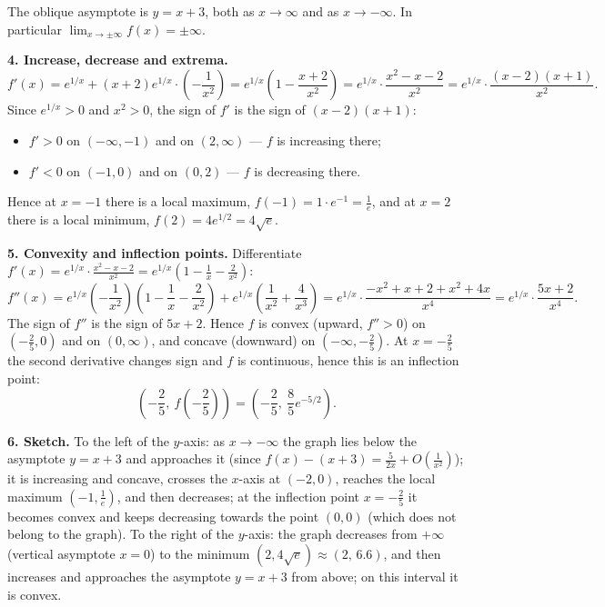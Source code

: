 \begin{solution}
\begin{itemize}
  The oblique asymptote is $y=x+3$, both as $x\to\infty$ and as $x\to-\infty$. In particular $\lim_{x\to\pm\infty}f(x)=\pm\infty$.
\end{itemize}

\textbf{4. Increase, decrease and extrema.}
\[ f'(x)=e^{1/x}+(x+2)e^{1/x}\cdot\left(-\frac{1}{x^2}\right)=e^{1/x}\left(1-\frac{x+2}{x^2}\right)=e^{1/x}\cdot\frac{x^2-x-2}{x^2}=e^{1/x}\cdot\frac{(x-2)(x+1)}{x^2}. \]
Since $e^{1/x}>0$ and $x^2>0$, the sign of $f'$ is the sign of $(x-2)(x+1)$:
\begin{itemize}
  \item $f'>0$ on $(-\infty,-1)$ and on $(2,\infty)$ — $f$ is increasing there;
  \item $f'<0$ on $(-1,0)$ and on $(0,2)$ — $f$ is decreasing there.
\end{itemize}
Hence at $x=-1$ there is a local maximum, $f(-1)=1\cdot e^{-1}=\frac1e$, and at $x=2$ there is a local minimum, $f(2)=4e^{1/2}=4\sqrt e$.

\textbf{5. Convexity and inflection points.} Differentiate $f'(x)=e^{1/x}\cdot\frac{x^2-x-2}{x^2}=e^{1/x}\left(1-\frac1x-\frac2{x^2}\right)$:
\[ f''(x)=e^{1/x}\left(-\frac1{x^2}\right)\left(1-\frac1x-\frac2{x^2}\right)+e^{1/x}\left(\frac1{x^2}+\frac4{x^3}\right)
=e^{1/x}\cdot\frac{-x^2+x+2+x^2+4x}{x^4}=e^{1/x}\cdot\frac{5x+2}{x^4}. \]
The sign of $f''$ is the sign of $5x+2$. Hence $f$ is convex (upward, $f''>0$) on $\left(-\frac25,0\right)$ and on $(0,\infty)$, and concave (downward) on $\left(-\infty,-\frac25\right)$. At $x=-\frac25$ the second derivative changes sign and $f$ is continuous, hence this is an inflection point:
\[ \left(-\frac25,\ f\left(-\frac25\right)\right)=\left(-\frac25,\ \frac85e^{-5/2}\right). \]

\textbf{6. Sketch.} To the left of the $y$-axis: as $x\to-\infty$ the graph lies below the asymptote $y=x+3$ and approaches it (since $f(x)-(x+3)=\frac{5}{2x}+O\left(\frac1{x^2}\right)$); it is increasing and concave, crosses the $x$-axis at $(-2,0)$, reaches the local maximum $\left(-1,\frac1e\right)$, and then decreases; at the inflection point $x=-\frac25$ it becomes convex and keeps decreasing towards the point $(0,0)$ (which does not belong to the graph). To the right of the $y$-axis: the graph decreases from $+\infty$ (vertical asymptote $x=0$) to the minimum $(2,4\sqrt e)\approx(2,\,6.6)$, and then increases and approaches the asymptote $y=x+3$ from above; on this interval it is convex.
\end{solution}
